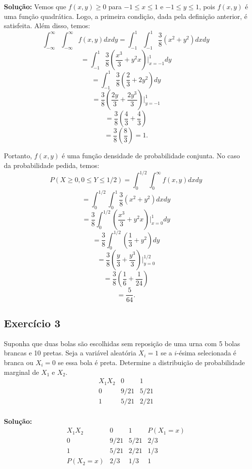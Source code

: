 \documentclass{article}
\begin{document}
\vspace{0.5cm}
\textbf{Solução:} Vemos que $f(x,y) \ge 0$ para $-1 \le x \le 1$ e $-1 \le y \le 1$, pois $f(x,y)$ é uma função quadrática. Logo, a primeira condição, dada pela definição anterior, é satisfeita. Além disso, temos:
    $$
    \int_{-\infty}^{\infty} \int_{-\infty}^{\infty} f(x,y) dx dy
    = \int_{-1}^{1} \int_{-1}^{1} \frac{3}{8}(x^2 + y^2) dx dy
    $$
    $$
    = \int_{-1}^{1} \frac{3}{8}\left(\frac{x^3}{3} + y^2 x\right)\bigg|_{x=-1}^{1} dy
    $$
    $$
    = \int_{-1}^{1} \frac{3}{8}\left(\frac{2}{3} + 2y^2\right) dy
    $$
    $$
    = \frac{3}{8}\left(\frac{2y}{3} + \frac{2y^3}{3}\right)\bigg|_{y=-1}^{1}
    $$
    $$
    = \frac{3}{8}\left(\frac{4}{3} + \frac{4}{3}\right)
    $$
    $$
    = \frac{3}{8}\left(\frac{8}{3}\right) = 1.
    $$

Portanto, $f(x,y)$ é uma função densidade de probabilidade conjunta.
No caso da probabilidade pedida, temos:
    $$
    P(X \ge 0, 0 \le Y \le 1/2) = \int_0^{1/2} \int_0^{\infty} f(x,y) dx dy
    $$
    $$
    = \int_0^{1/2} \int_0^{1} \frac{3}{8}(x^2 + y^2) dx dy
    $$
    $$
    = \frac{3}{8} \int_0^{1/2} \left( \frac{x^3}{3} + y^2 x \right) \bigg|_{x=0}^{1} dy
    $$
    $$
    = \frac{3}{8} \int_0^{1/2} \left( \frac{1}{3} + y^2 \right) dy
    $$
    $$
    = \frac{3}{8} \left( \frac{y}{3} + \frac{y^3}{3} \right) \bigg|_{y=0}^{1/2}
    $$
    $$
    = \frac{3}{8} \left( \frac{1}{6} + \frac{1}{24} \right)
    $$
    $$
    = \frac{5}{64}.
    $$
    
\subsection{Exercício 3}
Suponha que duas bolas são escolhidas sem reposição de uma urna com 5 bolas brancas e 10 pretas. Seja a variável aleatória $X_i = 1$ se a $i$-ésima selecionada é branca ou $X_i = 0$ se essa bola é preta. Determine a distribuição de probabilidade marginal de $X_1$ e $X_2$.
    $$
    \begin{array}{c|cc}
    X_1 X_2 & 0 & 1 \\
    \hline
    0 & 9/21 & 5/21 \\
    1 & 5/21 & 2/21 \\
    \end{array}
    $$

\vspace{0.5cm}
\textbf{Solução:}
    $$
    \begin{array}{c|cc|c}
    X_1 X_2 & 0 & 1 & P(X_1 = x) \\
    \hline
    0 & 9/21 & 5/21 & 2/3 \\
    1 & 5/21 & 2/21 & 1/3 \\
    \hline
    P(X_2 = x) & 2/3 & 1/3 & 1 \\
    \end{array}
    $$
\end{document}
